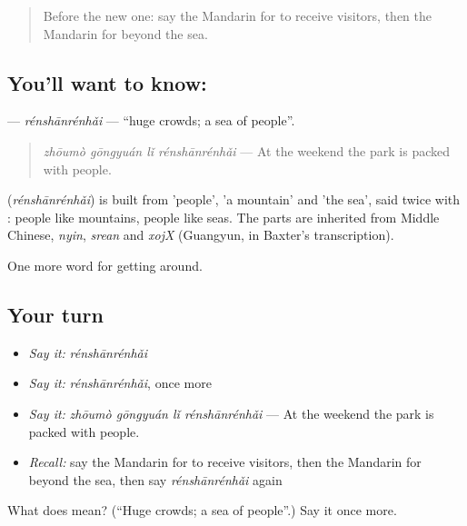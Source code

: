 \label{lesson:ZH-C433-renshanrenhai}



\begin{quote}
Before the new one: say the Mandarin for to receive visitors, then the Mandarin for beyond the sea.
\end{quote}

\subsection*{You'll want to know: }
\textbf{} — \emph{rénshānrénhǎi} — \textquotedblleft{}huge crowds; a sea of people\textquotedblright{}.

\begin{quote}
\emph{zhōumò gōngyuán lǐ rénshānrénhǎi} — At the weekend the park is packed with people.
\end{quote}

\begin{cousinweb}
\textbf{} (\emph{rénshānrénhǎi}) is built from  'people',  'a mountain' and  'the sea', said twice with : people like mountains, people like seas. The parts are inherited from Middle Chinese, \emph{nyin}, \emph{srean} and \emph{xojX} (Guangyun, in Baxter's transcription).
\end{cousinweb}

\begin{grammarlens}[title={What you've built}]
One more word for getting around.
\end{grammarlens}

\subsection*{Your turn}
\begin{itemize}
\raggedright
  \item \emph{Say it:} \emph{rénshānrénhǎi}
  \item \emph{Say it:} \emph{rénshānrénhǎi}, once more
  \item \emph{Say it:} \emph{zhōumò gōngyuán lǐ rénshānrénhǎi} — At the weekend the park is packed with people.
  \item \emph{Recall:} say the Mandarin for to receive visitors, then the Mandarin for beyond the sea, then say \emph{rénshānrénhǎi} again
\end{itemize}

\begin{tcolorbox}[breakable,colback=teal!4,colframe=teal!35!black,title={Before you move on}]
What does  mean? (\textquotedblleft{}Huge crowds; a sea of people\textquotedblright{}.) Say it once more.
\end{tcolorbox}
